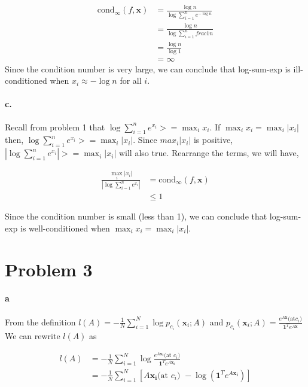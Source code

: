 \documentclass{scrartcl}
\begin{document}
\begin{align}
\textrm{cond}_\infty (f,\mathbf{x})
&= \frac{\log n}{\log \sum_{i=1}^{n} e^{-\log n}}\\
&= \frac{\log n}{\log \sum_{i=1}^{n} frac{1}{n}}\\
&= \frac{\log n}{\log 1}\\
&= \infty
\end{align}
Since the condition number is very large, we can conclude that log-sum-exp is ill-conditioned when $x_i \approx - \log n$ for all $i$.

\paragraph{c.}
Recall from problem 1 that $\log\sum_{i=1}^{n} e^{x_i} >= \max_ix_i$.
If $\max_ix_i = \max_i|x_i|$ then, $\log\sum_{i=1}^{n} e^{x_i} >= \max_i|x_i|$.
Since $max_i|x_i|$ is positive,  $|\log\sum_{i=1}^{n} e^{x_i}| >= \max_i|x_i|$ will also true. Rearrange the terms, we will have,

\begin{align}
 \frac{\max_i|x_i|}{|\log\sum_{i=1}^{n} e^{x_i}|} &=\textrm{cond}_\infty (f,\mathbf{x})\\
 &\leq 1 
\end{align}


Since the condition number is small (less than 1), we can conclude that log-sum-exp is well-conditioned when $\max_ix_i = \max_i|x_i|$.

\section*{Problem 3}
\paragraph{a} From the definition $l(A) = -\frac{1}{N}\sum_{i=1}^{N}\log p_{c_{i}}(\mathbf{x}_i;A)$ and $p_{c_{i}}(\mathbf{x}_i;A) = \frac{e^{A\mathbf{x}}\textrm{(at} c_{i}\textrm{)}}{\mathbf{1}^{T}e^{A\mathbf{x}}}$ We can rewrite $l(A)$ as

\begin{align}
l(A)
&=-\frac{1}{N}\sum_{i=1}^{N}\log\frac{e^{A\mathbf{x_i}} \textrm{(at }c_{i}\textrm{)}}{\mathbf{1}^{T}e^{A\mathbf{x_i}}}\\
&=-\frac{1}{N}\sum_{i=1}^{N} [A\mathbf{x_i} \textrm{(at }c_{i}\textrm{) } - \log(\mathbf{1}^Te^{A\mathbf{x_i}})]
\end{align}
\end{document}
